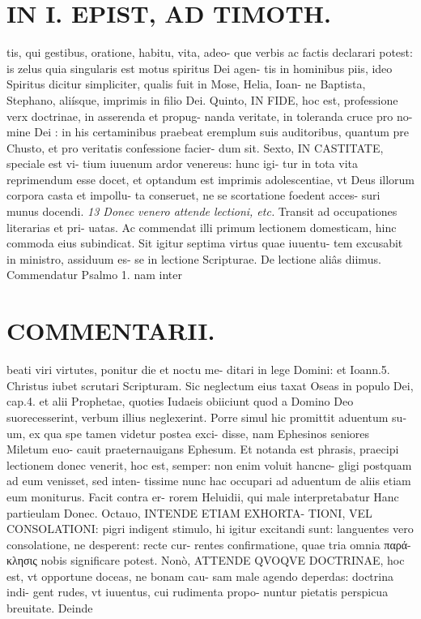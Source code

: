 \documentclass{article}
\begin{document}
\begin{pages}
\section*{IN I. EPIST, AD TIMOTH. }
\marginpar{[ p.109 ]}\pstart tis, qui gestibus, oratione, habitu, vita, adeo- que verbis ac factis declarari potest: is zelus quia singularis est motus spiritus Dei agen- tis in hominibus piis, ideo Spiritus dicitur simpliciter, qualis fuit in Mose, Helia, Ioan- ne Baptista, Stephano, aliísque, imprimis in filio Dei.  \pend\pstart Quinto, IN FIDE, hoc est, professione verx doctrinae, in asserenda et propug- nanda veritate, in toleranda cruce pro no- mine Dei : in his certaminibus praebeat eremplum suis auditoribus, quantum pre Chusto, et pro veritatis confessione facier- dum sit.  \pend\pstart Sexto, IN CASTITATE, speciale est vi- tium iuuenum ardor venereus: hunc igi- tur in tota vita reprimendum esse docet, et optandum est imprimis adolescentiae, vt Deus illorum corpora casta et impollu- ta conseruet, ne se scortatione foedent acces- suri munus docendi.  \pend
\textit{13 Donec venero attende lectioni, etc. }\pstart Transit ad occupationes literarias et pri- uatas. Ac commendat illi primum lectionem domesticam, hinc commoda eius subindicat. Sit igitur septima virtus quae iuuentu- tem excusabit in ministro, assiduum es- se in lectione Scripturae. De lectione aliâs diimus. Commendatur Psalmo 1. nam inter  \pend
\marginpar{[ p.110 ]}
\section*{COMMENTARII. }\pstart beati viri virtutes, ponitur die et noctu me- ditari in lege Domini: et Ioann.5. Christus iubet scrutari Scripturam. Sic neglectum eius taxat Oseas in populo Dei, cap.4. et alii Prophetae, quoties Iudaeis obiiciunt quod a Domino Deo suorecesserint, verbum illius neglexerint.  \pend\pstart Porre simul hic promittit aduentum su- um, ex qua spe tamen videtur postea exci- disse, nam Ephesinos seniores Miletum euo- cauit praeternauigans Ephesum. Et notanda est phrasis, praecipi lectionem donec venerit, hoc est, semper: non enim voluit hancne- gligi postquam ad eum venisset, sed inten- tissime nunc hac occupari ad aduentum de aliis etiam eum moniturus. Facit contra er- rorem Heluidii, qui male interpretabatur Hanc partieulam Donec.  \pend\pstart Octauo, INTENDE ETIAM EXHORTA- TIONI, VEL CONSOLATIONI: pigri indigent stimulo, hi igitur excitandi sunt: languentes vero consolatione, ne desperent: recte cur- rentes confirmatione, quae tria omnia παρά- κλησις nobis significare potest.  \pend\pstart Nonò, ATTENDE QVOQVE DOCTRINAE, hoc est, vt opportune doceas, ne bonam cau- sam male agendo deperdas: doctrina indi- gent rudes, vt iuuentus, cui rudimenta propo- nuntur pietatis perspicua breuitate. Deinde  \pend

\end{pages}
\end{document}
